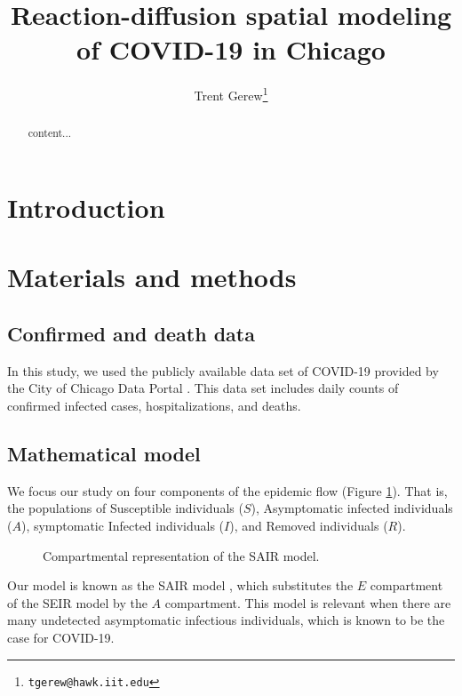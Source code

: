 \documentclass[11pt]{article}
\title{Reaction-diffusion spatial modeling of COVID-19 in Chicago}
\author{Trent Gerew\thanks{\texttt{tgerew@hawk.iit.edu}}}
\institute{Department of Applied Mathematics, Illinois Institute of Technology, Chicago, Illinois}
\begin{document}
\maketitle

\begin{abstract}
	content...
\end{abstract}

\section{Introduction}

\section{Materials and methods}
	\subsection{Confirmed and death data}
		In this study, we used the publicly available data set of COVID-19 provided by the City of Chicago Data Portal \cite{Chicago-cases}.
		This data set includes daily counts of confirmed infected cases, hospitalizations, and deaths.
	
	\subsection{Mathematical model}
		We focus our study on four components of the epidemic flow (Figure \ref{fig:model}).
		That is, the populations of Susceptible individuals ($S$), Asymptomatic infected individuals ($A$), symptomatic Infected individuals ($I$), and Removed individuals ($R$).
		\begin{figure}[h]
			\centering
			\caption{Compartmental representation of the SAIR model.}
			\label{fig:model}
		\end{figure}
		Our model is known as the SAIR model \cite{s+t+spain}, which substitutes the $E$ compartment of the SEIR model by the $A$ compartment.
		This model is relevant when there are many undetected asymptomatic infectious individuals, which is known to be the case for COVID-19.
		
\end{document}
